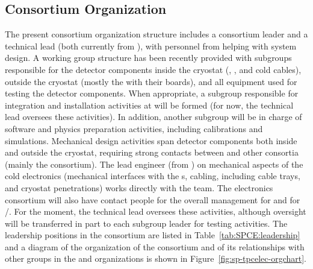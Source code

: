 \subsection{Consortium Organization}
\label{sec:fdsp-tpcelec-management-consort}

The present consortium organization
structure includes a consortium leader and a technical lead (both currently
from ), with personnel from  helping with system design. A working group structure has been recently 
provided with subgroups responsible for the detector 
components inside the cryostat (, , and
cold cables), outside the cryostat (mostly the  with 
their boards), and all equipment
used for testing the detector components. When appropriate, a subgroup
responsible for integration and installation activities at
 will be formed (for now, the technical lead oversees 
these activities). In addition,
another subgroup will be in charge of software and physics
preparation activities, including calibrations and simulations.
Mechanical design activities span detector components both inside
and outside the cryostat, requiring strong contacts between 
 and other consortia (mainly the 
consortium). The lead engineer (from ) on mechanical aspects of the cold
electronics (mechanical interfaces with the s, cabling, including 
cable trays, and cryostat penetrations) works directly with
the  team. The  electronics consortium will also have 
contact people for the overall  management for
 and for /. For the moment, the technical lead oversees these activities, although oversight
will be transferred in part to each subgroup leader for testing
activities. The leadership positions in the consortium 
are listed in Table~\ref{tab:SPCE:leadership} and a diagram of
the organization of the consortium and of its relationships
with other groups in the  and  organizations
is shown in Figure~\ref{fig:sp-tpcelec-orgchart}.


